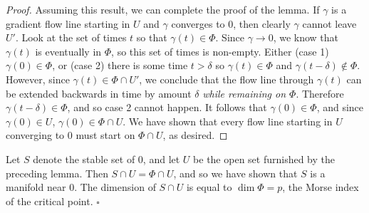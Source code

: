 \documentclass{amsart}
\begin{document}
\begin{proof}
  Assuming this result, we can complete the proof of the lemma. If $\gamma$ is a gradient flow line starting in $U$ and $\gamma$ converges to $0$, then clearly $\gamma$ cannot leave $U'$. Look at the set of times $t$ so that $\gamma(t)\in \Phi$. Since $\gamma\to 0$, we know that $\gamma(t)$ is eventually in $\Phi$, so this set of times is non-empty. Either (case 1) $\gamma(0)\in \Phi$, or (case 2) there is some time $t>\delta$ so $\gamma(t)\in \Phi$ and $\gamma(t-\delta)\not\in \Phi$. However, since $\gamma(t)\in \Phi\cap U'$, we conclude that the flow line through $\gamma(t)$ can be extended backwards in time by amount $\delta$ \emph{while remaining on $\Phi$}. Therefore $\gamma(t-\delta)\in \Phi$, and so case 2 cannot happen. It follows that $\gamma(0)\in \Phi$, and since $\gamma(0)\in U$, $\gamma(0)\in \Phi\cap U$. We have shown that every flow line starting in $U$ converging to $0$ must start on $\Phi\cap U$, as desired.
\end{proof}
\begin{cor}
  Let $S$ denote the stable set of $0$, and let $U$ be the open set furnished by the preceding lemma. Then $S\cap U=\Phi\cap U$, and so we have shown that $S$ is a manifold near $0$. The dimension of $S\cap U$ is equal to $\dim \Phi=p$, the Morse index of the critical point. \hfill $\square$
\end{cor}
\end{document}
